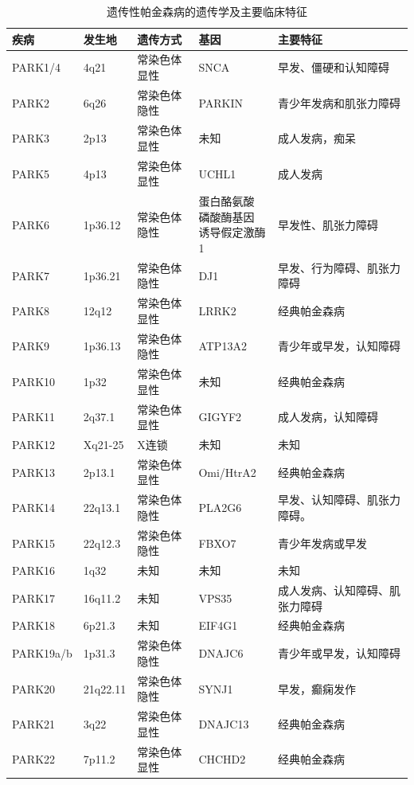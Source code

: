 \begin{table}[htbp]
	\caption{遗传性帕金森病的遗传学及主要临床特征} \label{tab:63_3} \centering
	\begin{tabular}{lllll}
		\toprule
		疾病 & 发生地 & 遗传方式 & 基因 & 主要特征\\
		\midrule
		PARK1/4 & 4q21 & 常染色体显性 & SNCA & 早发、僵硬和认知障碍 \\
		PARK2 & 6q26 & 常染色体隐性 & PARKIN & 青少年发病和肌张力障碍 \\
		PARK3 & 2p13 & 常染色体显性 & 未知 & 成人发病，痴呆 \\
		PARK5 & 4p13 & 常染色体显性 & UCHL1 & 成人发病 \\
		PARK6 & 1p36.12 & 常染色体隐性 & \makecell[l]{蛋白酪氨酸\\磷酸酶基因\\诱导假定激酶1} & 早发性、肌张力障碍 \\
		PARK7 & 1p36.21 & 常染色体隐性 & DJ1 & 早发、行为障碍、肌张力障碍 \\
		PARK8 & 12q12 & 常染色体显性 & LRRK2 & 经典帕金森病 \\
		PARK9 & 1p36.13 & 常染色体隐性 & ATP13A2 & 青少年或早发，认知障碍 \\
		PARK10 & 1p32 & 常染色体显性 & 未知 & 经典帕金森病 \\
		PARK11 & 2q37.1 & 常染色体显性 & GIGYF2 & 成人发病，认知障碍 \\
		PARK12 & Xq21-25 & X连锁 & 未知 & 未知 \\
		PARK13 & 2p13.1 & 常染色体显性 & Omi/HtrA2 & 经典帕金森病 \\
		PARK14 & 22q13.1 & 常染色体隐性 & PLA2G6 & 早发、认知障碍、肌张力障碍。 \\
		PARK15 & 22q12.3 & 常染色体隐性 & FBXO7 & 青少年发病或早发 \\
		PARK16 & 1q32 & 未知 & 未知 & 未知 \\
		PARK17 & 16q11.2 & 未知 & VPS35 & 成人发病、认知障碍、肌张力障碍 \\
		PARK18 & 6p21.3 & 未知 & EIF4G1 & 经典帕金森病 \\
		PARK19a/b & 1p31.3 & 常染色体隐性 & DNAJC6 & 青少年或早发，认知障碍 \\
		PARK20 & 21q22.11 & 常染色体隐性 & SYNJ1 & 早发，癫痫发作 \\
		PARK21 & 3q22 & 常染色体显性 & DNAJC13 & 经典帕金森病 \\
		PARK22 & 7p11.2 & 常染色体显性 & CHCHD2 & 经典帕金森病 \\
		\bottomrule
	\end{tabular}
\end{table}


